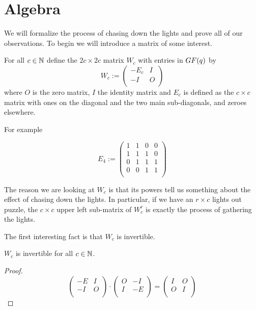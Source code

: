 \section{Algebra}
We will formalize the process of chasing down the lights and prove all of our
observations. To begin we will introduce a matrix of some interest.

For all $c\in\mathbb{N}$ define the $2c\times 2c$ matrix $W_{c}$ with entries in
$GF(q)$ by
\[
W_{c} := \left(
\begin{array}{cc}
  -E_{c} & I \\
  -I    & O \\
\end{array}
\right)
\]
where $O$ is the zero matrix, $I$ the identity matrix and $E_{c}$ is defined
as the $c\times c$ matrix with ones on the diagonal and the two main
sub-diagonals, and zeroes elsewhere.

For example

\[
E_{4} := \left(
\begin{array}{cccc}
  1 & 1 & 0 & 0 \\
  1 & 1 & 1 & 0 \\
  0 & 1 & 1 & 1 \\
  0 & 0 & 1 & 1 \\
\end{array}
\right)
\]

The reason we are looking at $W_{c}$ is that its powers tell us something about
the effect of chasing down the lights. In particular, if we have an $r \times c$
lights out puzzle, the $c \times c$ upper left sub-matrix of $W_{c}^{r}$ is
exactly the process of gathering the lights.

The first interesting fact is that $W_{c}$ is invertible.

\begin{lemma}
  $W_{c}$ is invertible for all $c\in\mathbb{N}$.
\end{lemma}

\begin{proof}
  \[
  \left(
  \begin{array}{cc}
    -E & I \\
    -I & O \\
  \end{array}
  \right)
  \cdot
  \left(
  \begin{array}{cc}
    O & -I  \\
    I & -E \\
  \end{array}
  \right)
  =
  \left(
  \begin{array}{cc}
    I & O \\
    O & I \\
  \end{array}
  \right)
  \]
\end{proof}

